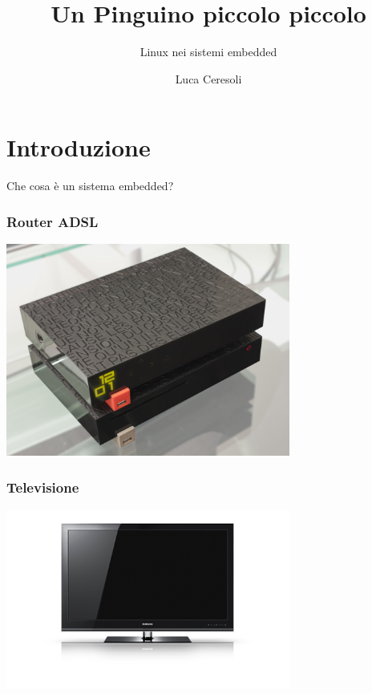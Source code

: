 \documentclass[xetex,table]{beamer}
\title{Un Pinguino piccolo piccolo}
\subtitle{Linux nei sistemi embedded}
\author{Luca Ceresoli}
\date{}
\begin{document}
\maketitle

\section{Introduzione}

  \begin{frame}{}
    \huge
    \begin{center}
      Che cosa è un sistema embedded?
    \end{center}
  \end{frame}

\begin{frame}
  \frametitle{Router ADSL}
  \begin{center}
    \includegraphics[width=0.7\textwidth]{images/freebox.jpg}
  \end{center}
\end{frame}

\begin{frame}
\frametitle{Televisione}
  \begin{center}
    \includegraphics[width=0.7\textwidth]{images/television.jpg}
  \end{center}
\end{frame}
\end{document}
